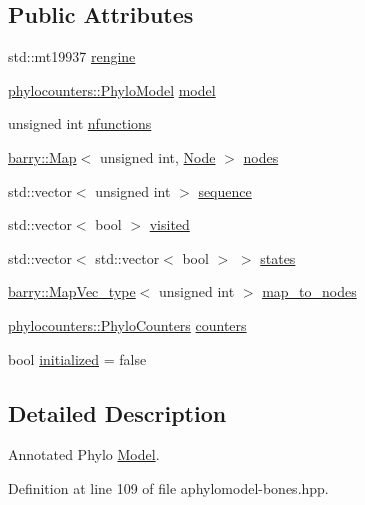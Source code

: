 \subsection*{Public Attributes}
\begin{DoxyCompactItemize}
\item 
std\+::mt19937 \hyperlink{class_a_phylo_model_a3f7a406330ca376840dcea3324e69448}{rengine}
\item 
\hyperlink{namespacebarry_1_1counters_1_1phylo_ad32b4186e3bab93119df225fddc3c609}{phylocounters\+::\+Phylo\+Model} \hyperlink{class_a_phylo_model_a8594c24aab4b3fe46cd2e4976c2031d9}{model}
\item 
unsigned int \hyperlink{class_a_phylo_model_aceefd34597d56589a10162c937d8200f}{nfunctions}
\item 
\hyperlink{namespacebarry_a979a04835a9855ff2054c383c569c89e}{barry\+::\+Map}$<$ unsigned int, \hyperlink{class_node}{Node} $>$ \hyperlink{class_a_phylo_model_af48d7223972ea6f74d2780b316db730e}{nodes}
\item 
std\+::vector$<$ unsigned int $>$ \hyperlink{class_a_phylo_model_a5f15ec301385244387c9be5290f5ee28}{sequence}
\item 
std\+::vector$<$ bool $>$ \hyperlink{class_a_phylo_model_ac98b6767ff0c32b30caf23dbf6810578}{visited}
\item 
std\+::vector$<$ std\+::vector$<$ bool $>$ $>$ \hyperlink{class_a_phylo_model_aa6a0a51491c065588bb3504d9b84540c}{states}
\item 
\hyperlink{namespacebarry_a2f0d3aab1d67e4c8eaeab9022e16139f}{barry\+::\+Map\+Vec\+\_\+type}$<$ unsigned int $>$ \hyperlink{class_a_phylo_model_ae041cf2aa3630fab0a050e176c9317f9}{map\+\_\+to\+\_\+nodes}
\item 
\hyperlink{namespacebarry_1_1counters_1_1phylo_a4e401ffe66d04091343dcffaf915f8c3}{phylocounters\+::\+Phylo\+Counters} \hyperlink{class_a_phylo_model_ac301d6887933072072bdf3472df5c8a3}{counters}
\item 
bool \hyperlink{class_a_phylo_model_a298c38ef857994159589a6c0f7578150}{initialized} = false
\end{DoxyCompactItemize}


\subsection{Detailed Description}
Annotated Phylo \hyperlink{class_model}{Model}. 

Definition at line 109 of file aphylomodel-\/bones.\+hpp.



